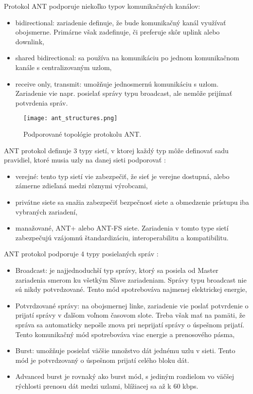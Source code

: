\documentclass[12pt,a4paper,oneside,openright]{report}
\begin{document}
Protokol ANT podporuje niekoľko typov komunikačných kanálov:
\begin{itemize}
	\item bidirectional: zariadenie definuje, že bude komunikačný kanál využívať obojsmerne. Primárne však zadefinuje, či preferuje skôr uplink alebo downlink,
	\item shared bidirectional: sa používa na komunikáciu po jednom komunikačnom kanále s centralizovaným uzlom,
	\item receive only, transmit: umožňuje jednosmernú komunikáciu s uzlom. Zariadenie vie napr. posielať správy typu broadcast, ale nemôže prijímať potvrdenia správ.
\end{itemize}

\begin{figure*}[h]
	\centering
	\texttt{[image: ant\_structures.png]}
	\caption{Podporované topológie protokolu ANT.\cite{ANT}}
	\label{f:a_ant_network_types}
\end{figure*}

ANT protokol definuje 3 typy sietí, v ktorej každý typ môže definovať sadu pravidiel, ktoré musia uzly na danej sieti podporovať \cite{ANT}:
\begin{itemize}
	\item verejné: tento typ sietí vie zabezpečiť, že sieť je verejne dostupná, alebo zámerne zdieľaná medzi rôznymi výrobcami,
	\item privátne siete sa snažia zabezpečiť bezpečnosť siete a obmedzenie prístupu iba vybraných zariadení,%
	\item manažované, ANT+ alebo ANT-FS siete. Zariadenia v tomto type sietí zabezpečujú vzájomnú štandardizáciu, interoperabilitu a kompatibilitu.
\end{itemize}
\onehalfspacing

ANT protokol podporuje 4 typy posielaných správ \cite{ANT}:
\begin{itemize}
	\item Broadcast: je najjednoduchší typ správy, ktorý sa posiela od Master zariadenia smerom ku všetkým Slave zariadeniam. Správy typu broadcast nie sú nikdy potvrdzované. Tento mód spotrebováva najmenej elektrickej energie,
	\item Potvrdzované správy: na obojsmernej linke, zariadenie vie poslať potvrdenie o prijatí správy v ďalšom voľnom časovom slote. Treba však mať na pamäti, že správa sa automaticky nepošle znova pri neprijatí správy o úspešnom prijatí. Tento komunikačný mód spotrebováva viac energie a prenosového pásma,
	\item Burst: umožňuje posielať väčšie množstvo dát jednému uzlu v sieti. Tento mód je potvrdzovaný o úspešnom prijatí celého bloku dát.
	\item Advanced burst je rovnaký ako burst mód, s jediným rozdielom vo väčšej rýchlosti prenosu dát medzi uzlami, blížiacej sa až k 60 kbps.
\end{itemize}
\onehalfspacing
\end{document}

